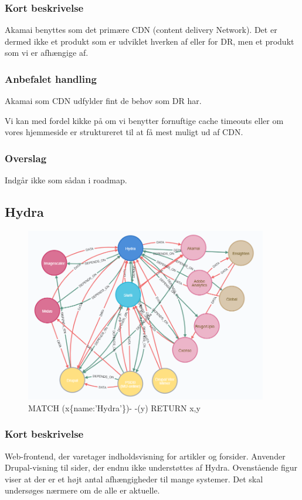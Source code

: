 \documentclass{article}
\begin{document}
\subsubsection{Kort beskrivelse}
Akamai benyttes som det primære CDN (content delivery Network). 
Det er dermed ikke et produkt som er udviklet hverken af eller for DR, 
men et produkt som vi er afhængige af. 
\subsubsection{Anbefalet handling}
Akamai som CDN udfylder fint de behov som DR har. 

Vi kan med fordel kikke på om vi benytter fornuftige cache timeouts eller om vores hjemmeside er struktureret til at få mest muligt ud af CDN.
\subsubsection{Overslag}
Indgår ikke som sådan i roadmap.


\subsection{Hydra}
\begin{figure}[h]
\includegraphics[width=300pt]{Hydra.PNG}
\caption{MATCH (x\{name:'Hydra'\})- -(y) RETURN x,y}
\end{figure}
\subsubsection{Kort beskrivelse}
Web-frontend, der varetager indholdsvisning for artikler og forsider. Anvender Drupal-visning til sider, der endnu ikke understøttes af Hydra.
Ovenstående figur viser at der er et højt antal afhængigheder til mange systemer. Det skal undersøges nærmere om de alle er aktuelle.
\end{document}
